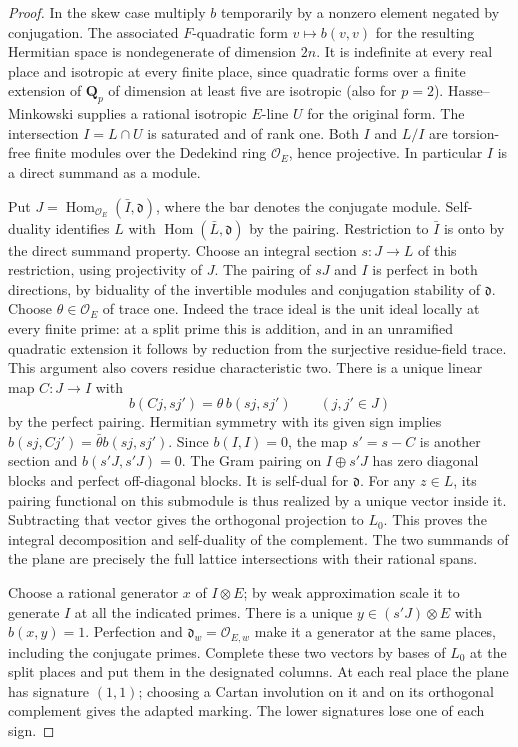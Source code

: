 \begin{proof}
In the skew case multiply \(b\) temporarily by a nonzero element
negated by conjugation. The associated \(F\)-quadratic form
\(v\mapsto b(v,v)\) for the resulting Hermitian space is nondegenerate
of dimension \(2n\). It is indefinite at every real place and isotropic
at every finite place, since quadratic forms over a finite extension
of \(\mathbf Q_p\) of dimension at least five are isotropic (also for
\(p=2\)). Hasse--Minkowski supplies a rational isotropic \(E\)-line
\(U\) for the original form. The intersection \(I=L\cap U\) is
saturated and of rank one. Both \(I\) and \(L/I\) are torsion-free
finite modules over the Dedekind ring \(\mathcal O_E\), hence projective.
In particular \(I\) is a direct summand as a module.

Put \(J=\operatorname{Hom}_{\mathcal O_E}(\bar I,\mathfrak d)\),
where the bar denotes the conjugate module. Self-duality identifies
\(L\) with \(\operatorname{Hom}(\bar L,\mathfrak d)\) by the pairing.
Restriction to \(\bar I\) is onto by the direct summand property.
Choose an integral section \(s:J\to L\) of this restriction,
using projectivity of \(J\). The pairing of \(sJ\) and \(I\)
is perfect in both directions, by biduality of the invertible modules
and conjugation stability of \(\mathfrak d\).
Choose \(\theta\in\mathcal O_E\) of trace one. Indeed the trace ideal
is the unit ideal locally at every finite prime: at a split prime
this is addition, and in an unramified quadratic extension it follows
by reduction from the surjective residue-field trace. This argument
also covers residue characteristic two.
There is a unique linear map \(C:J\to I\) with
\[
 b(Cj,sj')=\theta\, b(sj,sj')\qquad (j,j'\in J)
\]
by the perfect pairing. Hermitian symmetry with its given sign implies
\(b(sj,Cj')=\bar\theta b(sj,sj')\). Since \(b(I,I)=0\), the map
\(s'=s-C\) is another section and \(b(s'J,s'J)=0\).
The Gram pairing on \(I\oplus s'J\) has zero diagonal blocks and
perfect off-diagonal blocks. It is self-dual for \(\mathfrak d\).
For any \(z\in L\), its pairing functional on this submodule is thus
realized by a unique vector inside it. Subtracting that vector gives
the orthogonal projection to \(L_0\). This proves the integral
decomposition and self-duality of the complement. The two summands
of the plane are precisely the full lattice intersections with their
rational spans.

Choose a rational generator \(x\) of \(I\otimes E\); by weak
approximation scale it to generate \(I\) at all the indicated primes.
There is a unique \(y\in(s'J)\otimes E\) with \(b(x,y)=1\). Perfection
and \(\mathfrak d_w=\mathcal O_{E,w}\) make it a generator at the
same places, including the conjugate primes. Complete these two vectors
by bases of \(L_0\) at the split places and put them in the designated
columns. At each real place the plane has signature \((1,1)\);
choosing a Cartan involution on it and on its orthogonal complement
gives the adapted marking. The lower signatures lose one of each sign.
\end{proof}
